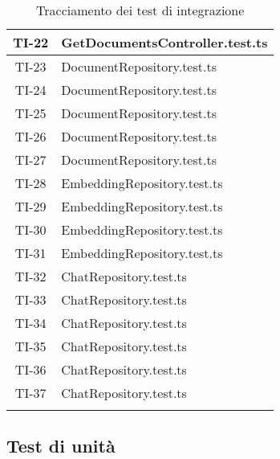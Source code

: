 \begin{xltabular}{0.7\textwidth}{| c | X |}
    \hline
    TI-22 & GetDocumentsController.test.ts \\
    \hline
    TI-23 & DocumentRepository.test.ts \\
    \hline
    TI-24 & DocumentRepository.test.ts \\
    \hline
    TI-25 & DocumentRepository.test.ts \\
    \hline
    TI-26 & DocumentRepository.test.ts \\
    \hline
    TI-27 & DocumentRepository.test.ts \\
    \hline
    TI-28 & EmbeddingRepository.test.ts \\
    \hline
    TI-29 & EmbeddingRepository.test.ts \\
    \hline
    TI-30 & EmbeddingRepository.test.ts \\
    \hline
    TI-31 & EmbeddingRepository.test.ts \\
    \hline
    TI-32 & ChatRepository.test.ts \\
    \hline
    TI-33 & ChatRepository.test.ts \\
    \hline
    TI-34 & ChatRepository.test.ts \\
    \hline
    TI-35 & ChatRepository.test.ts \\
    \hline
    TI-36 & ChatRepository.test.ts \\
    \hline
    TI-37 & ChatRepository.test.ts \\
    \hline
     \caption{Tracciamento dei test di integrazione}
    \label{tab:tracctestinter}
\end{xltabular}
\newpage
\subsection{Test di unità}

